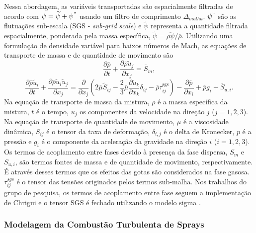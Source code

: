 Nessa abordagem, as variáveis transportadas são espacialmente filtradas de acordo com $\psi = \widetilde\psi + \psi^"$ usando um filtro de comprimento $\Delta_{malha}$. $\psi^"$ são as flutuações sub-escala (SGS - \emph{sub-grid scale}) e $\widetilde\psi$ representa a quantidade filtrada espacialmente, ponderada pela massa específica, $\widetilde\psi = \overline{\rho\psi}/\overline\rho$.
Utilizando uma formulação de densidade variável para baixos números de Mach, as equações de transporte de massa e de quantidade de movimento são
\begin{equation}
    \frac{\partial \overline \rho}{\partial t} + 
    \frac{\partial \overline \rho \widetilde u_j}{\partial x_j} = 
    \overline S_m,
\end{equation}
\begin{equation}
    \frac{\partial \overline\rho \widetilde u_i}{\partial t} + 
    \frac{\partial \overline\rho \widetilde u_i \widetilde u_j}{\partial x_j} =
    \frac{\partial }{\partial x_j} \left(
        2\overline\mu \widetilde S_{ij} -
        \frac{2}{3}\overline\mu \frac{\partial \widetilde u_k}{\partial x_k} \delta_{ij} -
        \overline\rho \tau_{ij}^{\text{sgs}}
    \right) -
    \frac{\partial \overline p}{\partial x_i} +
    \overline p g_i + 
    \overline S_{u,i}.
\end{equation}
Na equação de transporte de massa da mistura, $\rho$ é a massa específica da mistura, $t$ é o tempo, $u_j$ os componentes da velocidade na direção $j$ ($j=1,2,3$).
Na equação de transporte de quantidade de movimento, $\mu$ é a viscosidade dinâmica, $S_{ij}$ é o tensor da taxa de deformação, $\delta_{i,j}$ é o delta de Kronecker, $p$ é a pressão e $g_i$ é o componente da aceleração da gravidade na direção	$i$ ($i=1,2,3$). 
Os termos de acoplamento entre fases devido à presença da fase dispersa, $S_m$ e $S_{u,i}$,  são termos fontes de massa e de quantidade de movimento, respectivamente.
É através desses termos que os efeitos das gotas são considerados na fase gasosa.
$\tau_{ij}^{sgs}$ é o tensor das tensões originados pelos termos sub-malha.
Nos trabalhos do grupo de pesquisa, os termos de acoplamento entre fase seguem a implementação de Chrigui\etal{} \cite{ChriguiM2012} e o tensor SGS é fechado utilizando o modelo sigma \cite{NicoudF2011}.

\subsubsection{Modelagem da Combustão Turbulenta de Sprays} \label{sec:comb-sprays}

